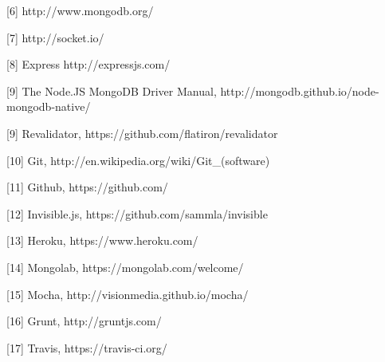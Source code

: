 \documentclass[doc,helv,longtable]{article}
\begin{document}
[6] http://www.mongodb.org/

[7] http://socket.io/

[8] Express http://expressjs.com/

[9] The Node.JS MongoDB Driver Manual, http://mongodb.github.io/node-mongodb-native/

[9] Revalidator, https://github.com/flatiron/revalidator

[10] Git, http://en.wikipedia.org/wiki/Git_(software)

[11] Github, https://github.com/

[12] Invisible.js, https://github.com/sammla/invisible

[13] Heroku, https://www.heroku.com/ 

[14] Mongolab, https://mongolab.com/welcome/

[15] Mocha, http://visionmedia.github.io/mocha/ 

[16] Grunt, http://gruntjs.com/

[17] Travis, https://travis-ci.org/
\end{document}

